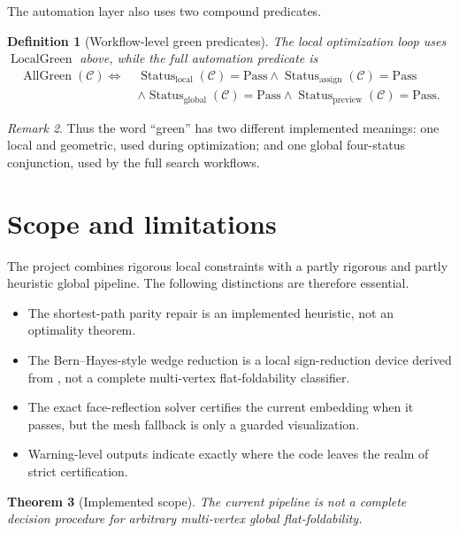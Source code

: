 \documentclass[11pt]{article}
\newtheorem{definition}{Definition}[section]
\newtheorem{theorem}[definition]{Theorem}
\theoremstyle{remark}
\newtheorem{remark}[definition]{Remark}
\newcommand{\CP}{\mathcal{C}}
\newcommand{\Pass}{\mathrm{Pass}}
\begin{document}
The automation layer also uses two compound predicates.

\begin{definition}[Workflow-level green predicates]
The local optimization loop uses $\operatorname{LocalGreen}$ above, while the
full automation predicate is
\[
\begin{aligned}
\operatorname{AllGreen}(\CP)
\Longleftrightarrow\;&
\operatorname{Status}_{\mathrm{local}}(\CP)=\Pass
\wedge
\operatorname{Status}_{\mathrm{assign}}(\CP)=\Pass
\\
&\wedge
\operatorname{Status}_{\mathrm{global}}(\CP)=\Pass
\wedge
\operatorname{Status}_{\mathrm{preview}}(\CP)=\Pass.
\end{aligned}
\]
\end{definition}

\begin{remark}
Thus the word ``green'' has two different implemented meanings: one local and
geometric, used during optimization; and one global four-status conjunction,
used by the full search workflows.
\end{remark}

\section{Scope and limitations}

The project combines rigorous local constraints with a partly rigorous and
partly heuristic global pipeline. The following distinctions are therefore
essential.

\begin{itemize}
    \item The shortest-path parity repair is an implemented heuristic, not an
    optimality theorem.
    \item The Bern--Hayes-style wedge reduction is a local sign-reduction
    device derived from {\cite{bern_hayes}}, not a complete multi-vertex
    flat-foldability classifier.
    \item The exact face-reflection solver certifies the current embedding when
    it passes, but the mesh fallback is only a guarded visualization.
    \item Warning-level outputs indicate exactly where the code leaves the realm
    of strict certification.
\end{itemize}

\begin{theorem}[Implemented scope]
The current pipeline is not a complete decision procedure for arbitrary
multi-vertex global flat-foldability.
\end{theorem}
\end{document}
